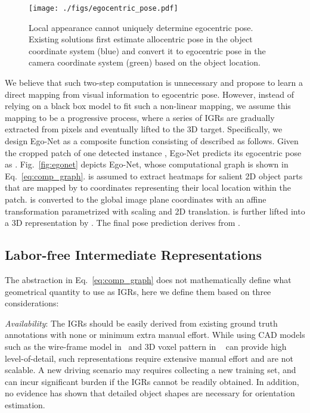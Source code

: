 \documentclass[final]{cvpr}
\begin{document}
\begin{figure}[h]
	\begin{center}
		\texttt{[image: ./figs/egocentric\_pose.pdf]}
	\end{center}
	\caption{Local appearance cannot uniquely determine egocentric pose. Existing solutions first estimate allocentric pose in the object coordinate system (blue) and convert it to egocentric pose in the camera coordinate system (green) based on the object location.}
	\label{fig:3.1}
\end{figure}

We believe that such two-step computation is unnecessary and propose to learn a direct mapping  from visual information to egocentric pose. However, instead of relying on a black box model to fit such a non-linear mapping, we assume this mapping to be a progressive process, where a series of IGRs are gradually extracted from pixels and eventually lifted to the 3D target. Specifically, we design Ego-Net as a composite function consisting of  described as follows. Given the cropped patch of one detected instance , Ego-Net predicts its egocentric pose as . Fig.~\ref{fig:egonet} depicts Ego-Net, whose computational graph is shown in Eq.~\ref{eq:comp_graph}.  is assumed to extract heatmaps  for salient 2D object parts that are mapped by  to coordinates  representing their local location within the patch.  is converted to the global image plane coordinates  with an affine transformation  parametrized with scaling and 2D translation.  is further lifted into a 3D representation  by . The final pose prediction derives from .        
 


\subsection{Labor-free Intermediate Representations}
The abstraction in Eq.~\ref{eq:comp_graph} does not mathematically define what geometrical quantity to use as IGRs, here we define them based on three considerations:

\noindent \emph{Availability}: The IGRs should be easily derived from existing ground truth annotations with none or minimum extra manual effort. While using CAD models such as the wire-frame model in~\cite{chabot2017deep} and 3D voxel pattern in ~\cite{xiang2015data} can provide high level-of-detail, such representations require extensive manual effort and are not scalable. A new driving scenario may requires collecting a new training set, and can incur significant burden if the IGRs cannot be readily obtained. In addition, no evidence has shown that detailed object shapes are necessary for orientation estimation.
\end{document}
